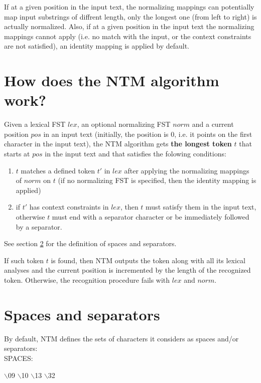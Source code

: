 \documentclass{article}
\begin{document}
If at a given position in the input text, the normalizing mappings can potentially map input substrings of diffrent length, only the longest one (from left to right) is actually normalized. Also, if at a given position in the input text the normalizing mappings cannot apply (i.e. no match with the input, or the context constraints are not satisfied), an identity mapping is applied by default.

\section{How does the NTM algorithm work?}
\label{NTMalgo}

Given a lexical FST $lex$, an optional normalizing FST $norm$ and a current position $pos$ in an input text (initially, the position is $0$, i.e. it points on the first character in the input text), the NTM algorithm gets {\bf the longest token} $t$ that starts at $pos$ in the input text and that satisfies the folowing conditions:

\begin{enumerate}

\item $t$ matches a defined token $t'$ in $lex$ after applying the normalizing mappings of $norm$ on $t$ (if no normalizing FST is specified, then the identity mapping is applied)
\item if $t'$ has context constraints in $lex$, then $t$ must satisfy them in the input text, otherwise $t$ must end with a separator character or be immediately followed by a separator. 

\end{enumerate}

See section \ref{spaces&separators} for the definition of spaces and separators.


If such token $t$ is found, then NTM outputs the token along with all its lexical analyses and the current position is incremented by the length of the recognized token. Otherwise, the recognition procedure fails with $lex$ and $norm$.


\section{Spaces and separators}
\label{spaces&separators}

By default, NTM defines the sets of characters it considers as spaces and/or separators:\\


SPACES: \\
\begin{tt}
$\backslash$09 $\backslash$10 $\backslash$13 $\backslash$32
\end{tt} \\
\end{document}
